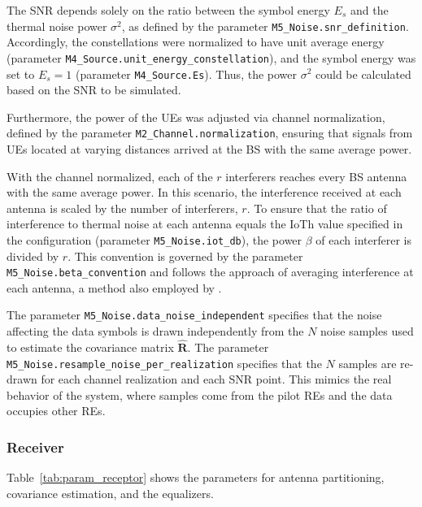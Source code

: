 The SNR depends solely on the ratio between the symbol energy $E_s$ and the thermal noise power $\sigma^2$, as defined by the parameter \texttt{M5\_Noise.snr\_definition}. Accordingly, the constellations were normalized to have unit average energy (parameter \texttt{M4\_Source.unit\_energy\_constellation}), and the symbol energy was set to $E_s = 1$ (parameter \texttt{M4\_Source.Es}). Thus, the power $\sigma^2$ could be calculated based on the SNR to be simulated.

Furthermore, the power of the UEs was adjusted via channel normalization, defined by the parameter \texttt{M2\_Channel.normalization}, ensuring that signals from UEs located at varying distances arrived at the BS with the same average power.

With the channel normalized, each of the $r$ interferers reaches every BS antenna with the same average power. In this scenario, the interference received at each antenna is scaled by the number of interferers, $r$. To ensure that the ratio of interference to thermal noise at each antenna equals the IoTh value specified in the configuration (parameter \texttt{M5\_Noise.iot\_db}), the power $\beta$ of each interferer is divided by $r$. This convention is governed by the parameter \texttt{M5\_Noise.beta\_convention} and follows the approach of averaging interference at each antenna, a method also employed by .

The parameter \texttt{M5\_Noise.data\_noise\_independent} specifies that the noise affecting the data symbols is drawn independently from the $N$ noise samples used to estimate the covariance matrix $\hat{\mathbf{R}}$. The parameter \texttt{M5\_Noise.resample\_noise\_per\_realization} specifies that the $N$ samples are re-drawn for each channel realization and each SNR point. This mimics the real behavior of the system, where samples come from the pilot REs and the data occupies other REs.

\subsubsection{Receiver}\label{subsec:setup_receptor}

Table~\ref{tab:param_receptor} shows the parameters for antenna partitioning, covariance estimation, and the equalizers.

